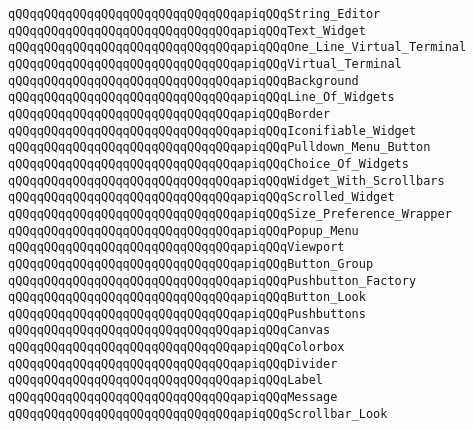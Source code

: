 \verb|qQQqqQQqqQQqqQQqqQQqqQQqqQQqqQQqapiqQQqString_Editor|\newline
\verb|qQQqqQQqqQQqqQQqqQQqqQQqqQQqqQQqapiqQQqText_Widget|\newline
\verb|qQQqqQQqqQQqqQQqqQQqqQQqqQQqqQQqapiqQQqOne_Line_Virtual_Terminal|\newline
\verb|qQQqqQQqqQQqqQQqqQQqqQQqqQQqqQQqapiqQQqVirtual_Terminal|\newline
\verb|qQQqqQQqqQQqqQQqqQQqqQQqqQQqqQQqapiqQQqBackground|\newline
\verb|qQQqqQQqqQQqqQQqqQQqqQQqqQQqqQQqapiqQQqLine_Of_Widgets|\newline
\verb|qQQqqQQqqQQqqQQqqQQqqQQqqQQqqQQqapiqQQqBorder|\newline
\verb|qQQqqQQqqQQqqQQqqQQqqQQqqQQqqQQqapiqQQqIconifiable_Widget|\newline
\verb|qQQqqQQqqQQqqQQqqQQqqQQqqQQqqQQqapiqQQqPulldown_Menu_Button|\newline
\verb|qQQqqQQqqQQqqQQqqQQqqQQqqQQqqQQqapiqQQqChoice_Of_Widgets|\newline
\verb|qQQqqQQqqQQqqQQqqQQqqQQqqQQqqQQqapiqQQqWidget_With_Scrollbars|\newline
\verb|qQQqqQQqqQQqqQQqqQQqqQQqqQQqqQQqapiqQQqScrolled_Widget|\newline
\verb|qQQqqQQqqQQqqQQqqQQqqQQqqQQqqQQqapiqQQqSize_Preference_Wrapper|\newline
\verb|qQQqqQQqqQQqqQQqqQQqqQQqqQQqqQQqapiqQQqPopup_Menu|\newline
\verb|qQQqqQQqqQQqqQQqqQQqqQQqqQQqqQQqapiqQQqViewport|\newline
\verb|qQQqqQQqqQQqqQQqqQQqqQQqqQQqqQQqapiqQQqButton_Group|\newline
\verb|qQQqqQQqqQQqqQQqqQQqqQQqqQQqqQQqapiqQQqPushbutton_Factory|\newline
\verb|qQQqqQQqqQQqqQQqqQQqqQQqqQQqqQQqapiqQQqButton_Look|\newline
\verb|qQQqqQQqqQQqqQQqqQQqqQQqqQQqqQQqapiqQQqPushbuttons|\newline
\verb|qQQqqQQqqQQqqQQqqQQqqQQqqQQqqQQqapiqQQqCanvas|\newline
\verb|qQQqqQQqqQQqqQQqqQQqqQQqqQQqqQQqapiqQQqColorbox|\newline
\verb|qQQqqQQqqQQqqQQqqQQqqQQqqQQqqQQqapiqQQqDivider|\newline
\verb|qQQqqQQqqQQqqQQqqQQqqQQqqQQqqQQqapiqQQqLabel|\newline
\verb|qQQqqQQqqQQqqQQqqQQqqQQqqQQqqQQqapiqQQqMessage|\newline
\verb|qQQqqQQqqQQqqQQqqQQqqQQqqQQqqQQqapiqQQqScrollbar_Look|\newline
